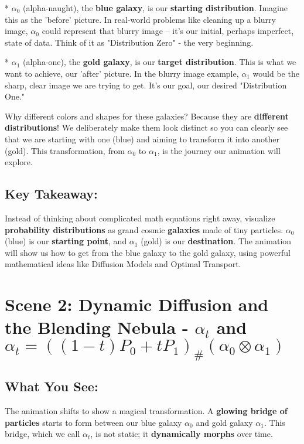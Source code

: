 \documentclass{article}
\begin{document}
*   \textbf{\( \alpha_0 \)} (alpha-naught), the \textbf{blue galaxy}, is our \textbf{starting distribution}. Imagine this as the 'before' picture. In real-world problems like cleaning up a blurry image, \( \alpha_0 \) could represent that blurry image – it's our initial, perhaps imperfect, state of data.  Think of it as "Distribution Zero" - the very beginning.

*   \textbf{\( \alpha_1 \)} (alpha-one), the \textbf{gold galaxy}, is our \textbf{target distribution}. This is what we want to achieve, our 'after' picture. In the blurry image example, \( \alpha_1 \) would be the sharp, clear image we are trying to get. It's our goal, our desired "Distribution One."

Why different colors and shapes for these galaxies? Because they are \textbf{different distributions}!  We deliberately make them look distinct so you can clearly see that we are starting with one (blue) and aiming to transform it into another (gold).  This transformation, from \( \alpha_0 \) to \( \alpha_1 \), is the journey our animation will explore.

\subsection*{Key Takeaway:}

Instead of thinking about complicated math equations right away, visualize \textbf{probability distributions} as grand cosmic \textbf{galaxies} made of tiny particles.  \textbf{\( \alpha_0 \)} (blue) is our \textbf{starting point}, and \textbf{\( \alpha_1 \)} (gold) is our \textbf{destination}.  The animation will show us how to get from the blue galaxy to the gold galaxy, using powerful mathematical ideas like Diffusion Models and Optimal Transport.

\hrulefill

\section*{Scene 2: Dynamic Diffusion and the Blending Nebula - \( \alpha_t \) and \( \alpha_t = ((1 - t)P_0 + tP_1)_{\#} (\alpha_0 \otimes \alpha_1) \)}

\subsection*{What You See:}

The animation shifts to show a magical transformation. A \textbf{glowing bridge of particles} starts to form between our blue galaxy \( \alpha_0 \) and gold galaxy \( \alpha_1 \). This bridge, which we call \textbf{\( \alpha_t \)}, is not static; it \textbf{dynamically morphs} over time.
\end{document}

